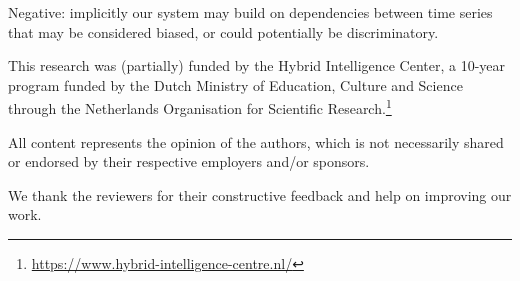 \documentclass{article}
\begin{document}
  Negative: implicitly our system may build on dependencies between time series that may be considered biased, or could potentially be discriminatory. 

\begin{ack}
  This research was (partially) funded by the Hybrid Intelligence Center, a 10-year program funded by the Dutch Ministry of Education, Culture and Science through the Netherlands Organisation for Scientific Research.\footnote{\url{https://www.hybrid-intelligence-centre.nl/}}

  All content represents the opinion of the authors, which is not necessarily shared or endorsed by their respective employers and/or sponsors.
  
  We thank the reviewers for their constructive feedback and help on improving our work. 

\end{ack}

 


\clearpage
\appendix
\end{document}
